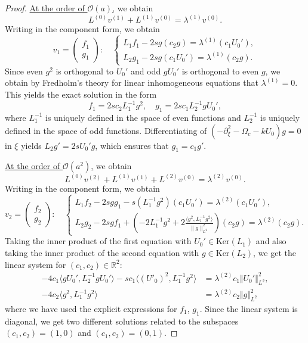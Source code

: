 \documentclass[10pt,a4paper]{amsart}
\begin{document}
\begin{proof}
\underline{At the order of $\mathcal{O}(a)$,} we obtain 
\[
L^{(0)} v^{(1)} + L^{(1)} v^{(0)} =\lambda^{(1)} v^{(0)}.
\]
Writing in the component form, we obtain 
$$
v_1=\begin{pmatrix}f_1\\g_1\end{pmatrix} : \quad \left\{ \begin{array}{l} L_1 f_1 - 2 s g (c_2 g) = \lambda^{(1)} (c_1 U_0'), \\
L_2 g_1 - 2 s g (c_1 U_0') = \lambda^{(1)} (c_2 g). \end{array} \right.
$$
Since even $g^2$ is orthogonal to $U_0'$ and odd $g U_0'$ is orthogonal to even $g$, we obtain by Fredholm's theory 
for linear inhomogeneous equations that $\lambda^{(1)} = 0$. This yields the exact solution in the form 
$$
f_1 = 2 s c_2 L_1^{-1} g^2, \quad g_1 = 2 s c_1 L_2^{-1} g U_0',
$$
where $L_1^{-1}$ is uniquely defined in the space of even functions and $L_2^{-1}$ is uniquely defined in the space of odd functions. 
Differentiating of $(-\partial_{\xi}^2 - \Omega_c - k U_0) g = 0$ in $\xi$ yields $L_2 g' = 2 s U_0' g$, which ensures that 
$g_1 = c_1 g'$.

\underline{At the order of $\mathcal{O}(a^2)$,} we obtain 
\[
L^{(0)} v^{(2)} + L^{(1)} v^{(1)} + L^{(2)} v^{(0)} =\lambda^{(2)} v^{(0)}.
\]
Writing in the component form, we obtain 
$$
v_2=\begin{pmatrix}f_2\\g_2\end{pmatrix} : \quad \left\{ \begin{array}{l} L_1 f_2 - 2 s g g_1 - s  (L_1^{-1} g^2) (c_1 U_0') = \lambda^{(2)} (c_1 U_0'), \\
L_2 g_2 - 2 s g f_1 + \left( - 2 L_1^{-1} g^2 + 2 \frac{\langle g^2, L_1^{-1} g^2 \rangle}{\| g \|^2_{L^2}} \right) (c_2 g) = \lambda^{(2)} (c_2 g). \end{array} \right.
$$
Taking the inner product of the first equation with \(U_0'\in \text{Ker}(L_1)\) and 
also taking the inner product of the second equation with \(g\in \text{Ker}(L_2)\), we get the linear system 
for $(c_1,c_2) \in \mathbb{R}^2$:
\begin{align*}
-4 c_1 \langle g U_0', L_2^{-1} g U_0' \rangle - s c_1 \langle (U'_0)^2, L_{1}^{-1}g^2 \rangle &= \lambda^{(2)} c_1 \Vert U_{0}'\Vert^2_{L^2}, \\
-4c_2\langle g^2, L_{1}^{-1}g^2\rangle &= \lambda^{(2)} c_2 \Vert g\Vert^2_{L^2}
\end{align*}
where we have used the explicit expressions for $f_1$, $g_1$. Since the linear system is diagonal, we get two different solutions 
related to the subspaces $(c_1,c_2) = (1,0)$ and $(c_1,c_2) = (0,1)$. 


\end{proof}
\end{document}
